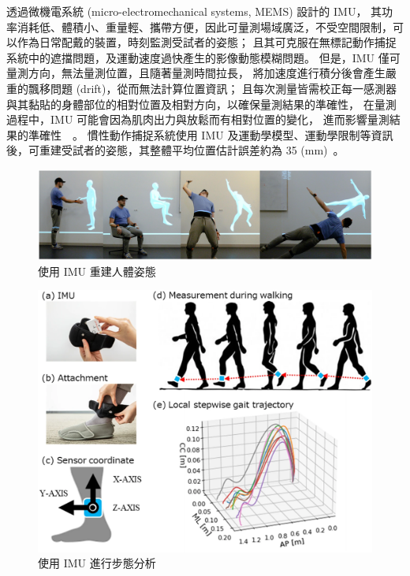 透過微機電系統 (micro-electromechanical systems, MEMS) 設計的 IMU，
其功率消耗低、體積小、重量輕、攜帶方便，因此可量測場域廣泛，不受空間限制，可以作為日常配戴的裝置，時刻監測受試者的姿態；
且其可克服在無標記動作捕捉系統中的遮擋問題，及運動速度過快產生的影像動態模糊問題。
但是，IMU 僅可量測方向，無法量測位置，且隨著量測時間拉長，
將加速度進行積分後會產生嚴重的飄移問題 (drift)，從而無法計算位置資訊；
且每次測量皆需校正每一感測器與其黏貼的身體部位的相對位置及相對方向，以確保量測結果的準確性，
在量測過程中，IMU 可能會因為肌肉出力與放鬆而有相對位置的變化，
進而影響量測結果的準確性~\cite{fiorentino2017soft}~\cite{stagni2005quantification}。
慣性動作捕捉系統使用 IMU 及運動學模型、運動學限制等資訊後，可重建受試者的姿態，其整體平均位置估計誤差約為 35 (mm)~\cite{s17061257}。

\begin{figure}[!ht]
    \centering
    \includegraphics[width=\linewidth]{figure/ch2_fig_IMU_pose_estimate.png}
     \caption[使用 IMU 重建人體姿態 ~\cite{DIP:SIGGRAPHAsia:2018}]{使用 IMU 重建人體姿態 ~\cite{DIP:SIGGRAPHAsia:2018}}
     \label{ch2_fig_IMU_pose_estimate}
\end{figure}

\begin{figure}[!ht]
    \centering
    \includegraphics[width=\linewidth]{figure/ch2_fig_IMU_gait_estimate.png}
     \caption[使用 IMU 進行步態分析 ~\cite{uchitomi2022three}]{使用 IMU 進行步態分析 ~\cite{uchitomi2022three}}
     \label{ch2_fig_IMU_gait_estimate}
\end{figure}

